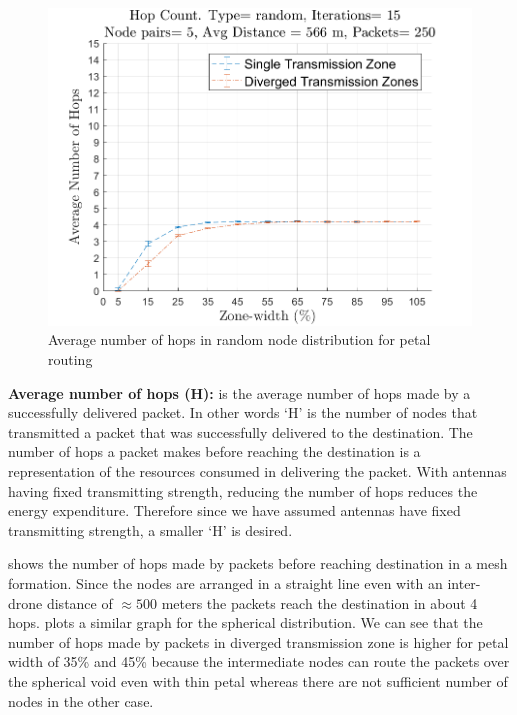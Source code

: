 \begin{figure}[hbtp]
\centering
\includegraphics[width=\simResultFigSize\textwidth,height=\textheight,keepaspectratio]{ncsuthesis-0.6/Chapter-5/figs/pe_hops_random.png}
\caption{Average number of hops in random node distribution for petal routing}
\label{fig:pe_hops_random}
\end{figure}

\textbf{Average number of hops (H):} is the average number of hops made by a successfully delivered packet. In other words `H' is the number of nodes that transmitted a packet that was successfully delivered to the destination. The number of hops a packet makes before reaching the destination is a representation of the resources consumed in delivering the packet. With antennas having fixed transmitting strength, reducing the number of hops reduces the energy expenditure. Therefore since we have assumed antennas have fixed transmitting strength, a smaller `H' is desired.

 shows the number of hops made by packets before reaching destination in a mesh formation. Since the nodes are arranged in a straight line even with an inter-drone distance of $\approx 500$ meters the packets reach the destination in about 4 hops.  plots a similar graph for the spherical distribution. We can see that the number of hops made by packets in  diverged transmission zone is higher for petal width of 35\% and 45\% because the intermediate nodes can route the packets over the spherical void even with thin petal whereas there are not sufficient number of nodes in the other case.

